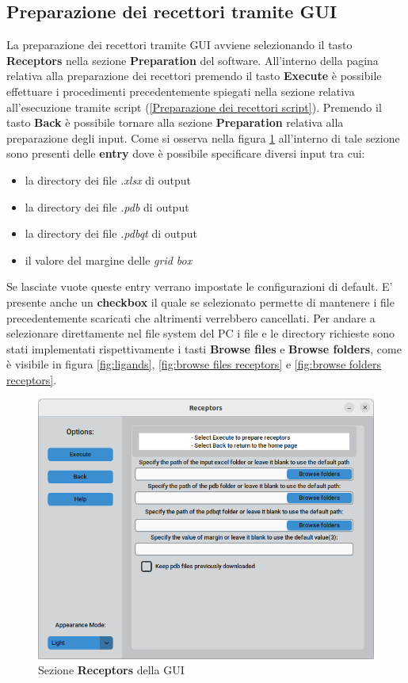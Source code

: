\subsection{Preparazione dei recettori tramite GUI}
La preparazione dei recettori tramite GUI avviene selezionando il tasto \textbf{Receptors} nella sezione \textbf{Preparation} del software. All'interno della pagina relativa alla preparazione dei recettori premendo il tasto \textbf{Execute} è possibile effettuare i procedimenti precedentemente spiegati nella sezione relativa all'esecuzione tramite script (\ref{Preparazione dei recettori script}). Premendo il tasto \textbf{Back} è possibile tornare alla sezione \textbf{Preparation} relativa alla preparazione degli input.
Come si osserva nella figura \ref{fig:receptors} all'interno di tale sezione sono presenti delle \textbf{entry} dove è possibile specificare diversi input tra cui:

\begin{itemize}
    \item la directory dei file \textit{.xlsx} di output
    \item la directory dei file \textit{.pdb} di output
    \item la directory dei file \textit{.pdbqt} di output
    \item il valore del margine delle \textit{grid box}
\end{itemize}

Se lasciate vuote queste entry verrano impostate le configurazioni di default. E' presente anche un \textbf{checkbox} il quale se selezionato permette di mantenere i file precedentemente scaricati che altrimenti verrebbero cancellati.\newline
Per andare a selezionare direttamente nel file system del PC i file e le directory richieste sono stati implementati rispettivamente i tasti \textbf{Browse files} e \textbf{Browse folders}, come è visibile in figura \ref{fig:ligands}, \ref{fig:browse files receptors} e \ref{fig:browse folders receptors}.

\begin{figure}[H]
    \centering
    \includegraphics[scale=0.6]{immagini/receptors.png}
    \caption{Sezione \textbf{Receptors} della GUI}
    \label{fig:receptors}
\end{figure}

